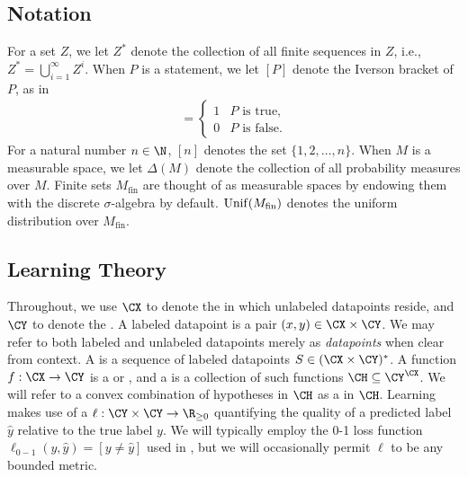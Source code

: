 \documentclass[11pt]{article}
\begin{document}
\subsection{Notation}

For a set $Z$, we let $Z^*$ denote the collection of all finite sequences in $Z$, i.e., $Z^* = \bigcup_{i=1}^{\infty} Z^i$. When $P$ is a statement, we let $[P]$ denote the Iverson bracket of $P$, as in 
\begin{align*}
[P] = \begin{cases} 1 & P \text{ is true,} \\ 0 & P \text{ is false.} \end{cases}
\end{align*}
For a natural number $n \in \N$, $[n]$ denotes the set $\{1, 2, \ldots, n\}$. When $M$ is a measurable space, we let $\Delta(M)$ denote the collection of all probability measures over $M$. Finite sets $M_{\mathrm{fin}}$ are thought of as measurable spaces by endowing them with the discrete $\sigma$-algebra by default. $\operatorname{Unif}(M_{\mathrm{fin}})$ denotes the uniform distribution over $M_{\mathrm{fin}}$.

\subsection{Learning Theory}

Throughout, we use $\CX$ to denote the  in which unlabeled datapoints reside, and $\CY$ to denote the . A labeled datapoint is a pair $(x, y) \in \CX \times \CY$. We may refer to both labeled and unlabeled datapoints merely as \emph{datapoints} when clear from context. 
A  is a sequence of labeled datapoints $S \in (\CX \times \CY)^*$. A function $f: \CX \to \CY$ is a  or , and a  is a collection of such functions $\CH \subseteq \CY^\CX$.  
We will refer to a convex combination of hypotheses in $\CH$ as a  in $\CH$. 
Learning makes use of a  $\ell : \CY \times \CY \to \R_{\geq 0}$ quantifying the quality of a predicted label $\hat{y}$ relative to the true label $y$. We will typically employ the 0-1 loss function $\ell_{0-1}(y, \hat{y}) = [y \neq \hat{y}]$ used in , but we will occasionally permit $\ell$ to be any bounded metric. 
\end{document}
